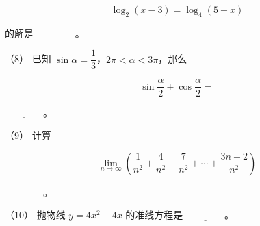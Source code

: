 \begin{question}
\nopagebreak[4]
\[
\log_2(x-3)=\log_4(5-x)
\]

的解是 $\underline{\hspace{4em}}$。

（8） 已知 $\sin\alpha=\dfrac13$，$2\pi<\alpha<3\pi$，那么

\nopagebreak[4]
\[
\sin\frac\alpha2+\cos\frac\alpha2=
\]

 $\underline{\hspace{4em}}$。

（9） 计算

\nopagebreak[4]
\[
\lim_{n\to\infty}\left(\frac1{n^2}+\frac4{n^2}+\frac7{n^2}+\cdots+\frac{3n-2}{n^2}\right)
\]

 $\underline{\hspace{4em}}$。

（10） 抛物线 $y=4x^2-4x$ 的准线方程是 $\underline{\hspace{4em}}$。

\end{question}
